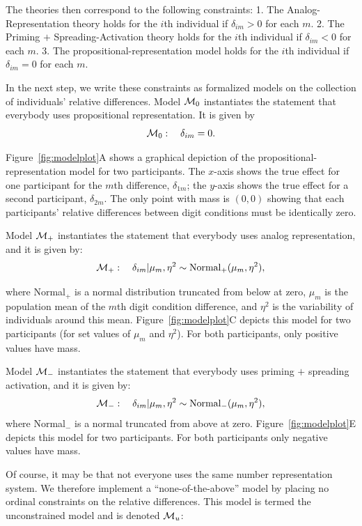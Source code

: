 \documentclass[english,,man]{apa6}
\begin{document}
The theories then correspond to the following constraints: 1. The Analog-Representation theory holds for the \(i\)th individual if \(\delta_{im}>0\) for each \(m\). 2. The Priming \(+\) Spreading-Activation theory holds for the \(i\)th individual if \(\delta_{im}<0\) for each \(m\). 3. The propositional-representation model holds for the \(i\)th individual if \(\delta_{im}=0\) for each \(m\).

In the next step, we write these constraints as formalized models on the collection of individuals' relative differences. Model \({\cal M}_0\) instantiates the statement that everybody uses propositional representation. It is given by
\[
{\cal M}_0: \quad \delta_{im}=0.
\]

Figure~\ref{fig:modelplot}A shows a graphical depiction of the propositional-representation model for two participants. The \(x\)-axis shows the true effect for one participant for the \(m\)th difference, \(\delta_{1m}\); the \(y\)-axis shows the true effect for a second participant, \(\delta_{2m}\). The only point with mass is \((0,0)\) showing that each participants' relative differences between digit conditions must be identically zero.

Model \({\cal M}_+\) instantiates the statement that everybody uses analog representation, and it is given by:
\[
{\cal M}_+: \quad \delta_{im}|\mu_m,\eta^2 \sim \mbox{Normal}_+(\mu_m,\eta^2),
\]

where Normal\(_+\) is a normal distribution truncated from below at zero, \(\mu_m\) is the population mean of the \(m\)th digit condition difference, and \(\eta^2\) is the variability of individuals around this mean. Figure~\ref{fig:modelplot}C depicts this model for two participants (for set values of \(\mu_m\) and \(\eta^2\)). For both participants, only positive values have mass.

Model \({\cal M}_-\) instantiates the statement that everybody uses priming \(+\) spreading activation, and it is given by:
\[
{\cal M}_-: \quad \delta_{im}|\mu_m,\eta^2 \sim \mbox{Normal}_-(\mu_m,\eta^2),
\]
where Normal\(_-\) is a normal truncated from above at zero. Figure~\ref{fig:modelplot}E depicts this model for two participants. For both participants only negative values have mass.

Of course, it may be that not everyone uses the same number representation system. We therefore implement a \enquote{none-of-the-above} model by placing no ordinal constraints on the relative differences. This model is termed the unconstrained model and is denoted \({\cal M}_u\):
\end{document}
